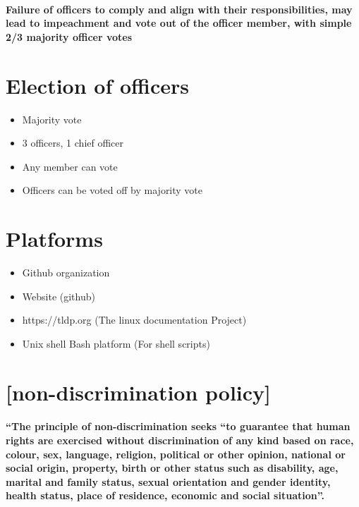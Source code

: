 \documentclass[a4paper, 11pt]{amsart}
\begin{document}
\paragraph{Failure of officers to comply and align with their responsibilities, may lead to impeachment and vote out of the officer member, with simple 2/3 majority officer votes}


\section{Election of officers}
\begin{itemize}
    \item Majority vote
    \item 3 officers, 1 chief officer
    \item Any member can vote
    \item Officers can be voted off by majority vote
\end{itemize}

\section{Platforms}
\begin{itemize}
    \item Github organization

    \item Website (github)
    \item https://tldp.org (The linux documentation Project)
    \item Unix shell Bash platform (For shell scripts)
\end{itemize}

\section{[non-discrimination policy]}
\paragraph{“The principle of non-discrimination seeks “to guarantee that human rights are exercised without discrimination of any kind based on race, colour, sex, language, religion, political or other opinion, national or social origin, property, birth or other status such as disability, age, marital and family status, sexual orientation and gender identity, health status, place of residence, economic and social situation”.}
\end{document}

